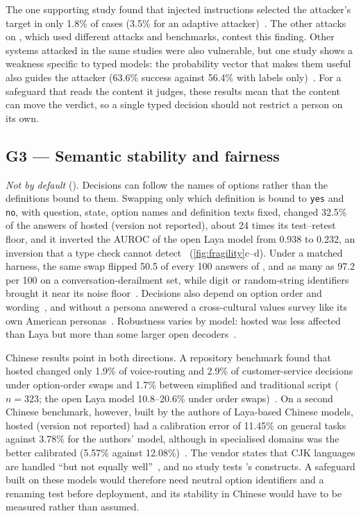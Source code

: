 The one supporting study found that injected instructions selected the attacker's target in only 1.8\% of cases (3.5\% for an adaptive attacker)~\cite{arx28613}.
The other attacks on \jev{}, which used different attacks and benchmarks, contest this finding.
Other systems attacked in the same studies were also vulnerable, but one study shows a weakness specific to typed models: the probability vector that makes them useful also guides the attacker (63.6\% success against 56.4\% with labels only)~\cite{arx30243}.
For a safeguard that reads the content it judges, these results mean that the content can move the verdict, so a single typed decision should not restrict a person on its own.

\subsection{G3 --- Semantic stability and fairness}
\label{sec:g3}

\emph{Not by default} (\nTallyThree{}).
Decisions can follow the names of options rather than the definitions bound to them.
Swapping only which definition is bound to \texttt{yes} and \texttt{no}, with question, state, option names and definition texts fixed, changed 32.5\% of the answers of hosted \jev{} (version not reported), about 24 times its test--retest floor, and it inverted the AUROC of the open Laya model from 0.938 to 0.232, an inversion that a type check cannot detect~\cite{arx26758} (\cref{fig:fragility}c--d).
Under a matched harness, the same swap flipped 50.5 of every 100 answers of \jev{}, and as many as 97.2 per 100 on a conversation-derailment set, while digit or random-string identifiers brought it near its noise floor~\cite{arx00346}.
Decisions also depend on option order and wording~\cite{arx38827,zen23023694}\zmark{}, and without a persona \jev{} answered a cross-cultural values survey like its own American personas~\cite{arx36399}.
Robustness varies by model: hosted \jev{} was less affected than Laya but more than some larger open decoders~\cite{arx00346}.

Chinese results point in both directions.
A repository benchmark found that hosted \jev{} changed only 1.9\% of voice-routing and 2.9\% of customer-service decisions under option-order swaps and 1.7\% between simplified and traditional script ($n = 323$; the open Laya model 10.8--20.6\% under order swaps)~\cite{qin2026zhdecisionbench}\gmark{}.
On a second Chinese benchmark, however, built by the authors of Laya-based Chinese models, hosted \jev{} (version not reported) had a calibration error of 11.45\% on general tasks against 3.78\% for the authors' model, although in specialised domains \jev{} was the better calibrated (5.57\% against 12.08\%)~\cite{arx36965}.
The vendor states that CJK languages are handled ``but not equally well''~\cite{typesafe_models}, and no study tests \pol{}'s constructs.
A safeguard built on these models would therefore need neutral option identifiers and a renaming test before deployment, and its stability in Chinese would have to be measured rather than assumed.

